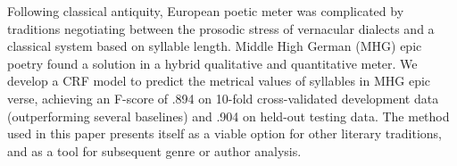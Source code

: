 Following classical antiquity, European poetic meter was complicated by traditions negotiating between the prosodic stress of vernacular dialects and a classical system based on syllable length. Middle High German (MHG) epic poetry found a solution in a hybrid qualitative and quantitative meter. We develop a CRF model to predict the metrical values of syllables in MHG epic verse, achieving an F-score of .894 on 10-fold cross-validated development data (outperforming several baselines) and .904 on held-out testing data. The method used in this paper presents itself as a viable option for other literary traditions, and as a tool for subsequent genre or author analysis.
